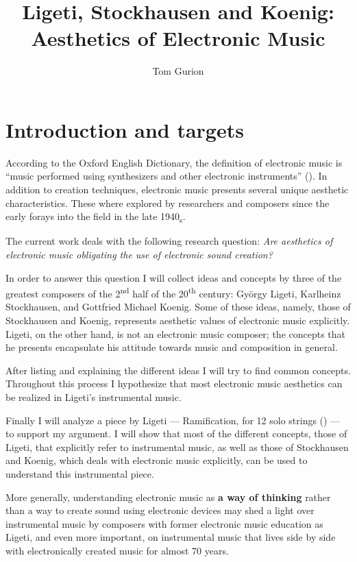 \documentclass[a4paper,11pt]{article}
\title{Ligeti, Stockhausen and Koenig:\\Aesthetics of Electronic Music}
\author{Tom Gurion}
\begin{document}
\maketitle
\tableofcontents

\section{Introduction and targets}
\label{sec:introduction}

According to the Oxford English Dictionary, the definition of electronic music is ``music performed using synthesizers and other electronic instruments'' (\cite{oxford_electronic_music}).
In addition to creation techniques, electronic music presents several unique aesthetic characteristics.
These where explored by researchers and composers since the early forays into the field in the late 1940\textsubscript{s}.

The current work deals with the following research question:
\emph{Are aesthetics of electronic music obligating the use of electronic sound creation?}

In order to answer this question I will collect ideas and concepts by three of the greatest composers of the 2\textsuperscript{nd} half of the 20\textsuperscript{th} century: Gy{\"o}rgy Ligeti, Karlheinz Stockhausen, and Gottfried Michael Koenig.
Some of these ideas, namely, those of Stockhausen and Koenig, represents aesthetic values of electronic music explicitly.
Ligeti, on the other hand, is not an electronic music composer;
the concepts that he presents encapsulate his attitude towards music and composition in general.

After listing and explaining the different ideas I will try to find common concepts.
Throughout this process I hypothesize that most electronic music aesthetics can be realized in Ligeti's instrumental music.

Finally I will analyze a piece by Ligeti --- Ramification, for 12 solo strings (\cite{rami}) --- to support my argument.
I will show that most of the different concepts, those of Ligeti, that explicitly refer to instrumental music, as well as those of Stockhausen and Koenig, which deals with electronic music explicitly, can be used to understand this instrumental piece.

More generally, understanding electronic music as \textbf{a way of thinking} rather than a way to create sound using electronic devices may shed a light over instrumental music by composers with former electronic music education as Ligeti, and even more important, on instrumental music that lives side by side with electronically created music for almost 70 years.
\end{document}
